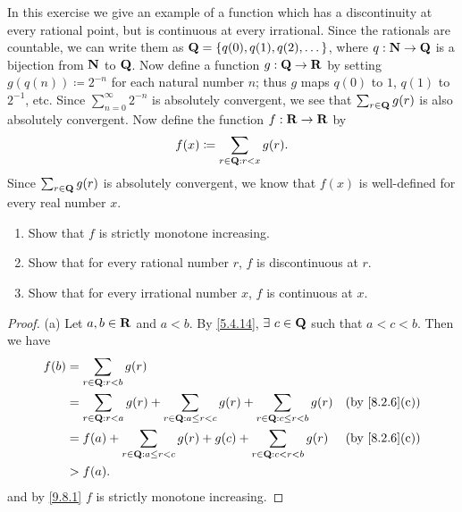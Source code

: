 \begin{exercise}\label{ex 9.8.5}
  In this exercise we give an example of a function which has a discontinuity at every rational point, but is continuous at every irrational.
  Since the rationals are countable, we can write them as \(\mathbf{Q} = \{q(0), q(1), q(2), \dots\}\), where \(q : \mathbf{N} \to \mathbf{Q}\) is a bijection from \(\mathbf{N}\) to \(\mathbf{Q}\).
  Now define a function \(g : \mathbf{Q} \to \mathbf{R}\) by setting \(g(q(n)) \coloneqq 2^{-n}\) for each natural number \(n\);
  thus \(g\) maps \(q(0)\) to \(1\), \(q(1)\) to \(2^{-1}\), etc.
  Since \(\sum_{n = 0}^\infty 2^{-n}\) is absolutely convergent, we see that \(\sum_{r \in \mathbf{Q}} g(r)\) is also absolutely convergent.
  Now define the function \(f : \mathbf{R} \to \mathbf{R}\) by
  \[
    f(x) \coloneqq \sum_{r \in \mathbf{Q} : r < x} g(r).
  \]
  Since \(\sum_{r \in \mathbf{Q}} g(r)\) is absolutely convergent, we know that \(f(x)\) is well-defined for every real number \(x\).
  \begin{enumerate}
    \item Show that \(f\) is strictly monotone increasing.
    \item Show that for every rational number \(r\), \(f\) is discontinuous at \(r\).
    \item Show that for every irrational number \(x\), \(f\) is continuous at \(x\).
  \end{enumerate}
\end{exercise}

\begin{proof}{(a)}
  Let \(a, b \in \mathbf{R}\) and \(a < b\).
  By \cref{5.4.14}, \(\exists\ c \in \mathbf{Q}\) such that \(a < c < b\).
  Then we have
  \begin{align*}
    f(b) & = \sum_{r \in \Q : r < b} g(r)                                                                                                           \\
         & = \sum_{r \in \Q : r < a} g(r) + \sum_{r \in \Q : a \leq r < c} g(r) + \sum_{r \in \Q : c \leq r < b} g(r) & \text{(by \cref{8.2.6}(c))} \\
         & = f(a) + \sum_{r \in \Q : a \leq r < c} g(r) + g(c) + \sum_{r \in \Q : c < r < b} g(r)                     & \text{(by \cref{8.2.6}(c))} \\
         & > f(a).
  \end{align*}
  and by \cref{9.8.1} \(f\) is strictly monotone increasing.
\end{proof}

